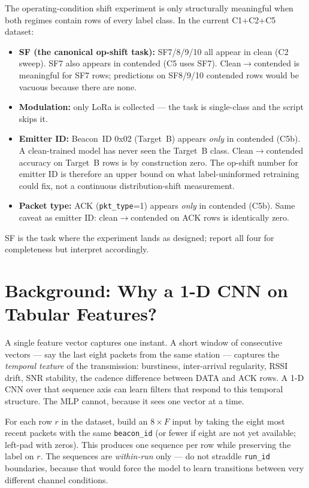 \documentclass[11pt,letterpaper]{article}
\begin{document}
\begin{tcolorbox}[warning={Op-shift validity is task-dependent}]
The operating-condition shift experiment is only structurally meaningful when both regimes contain rows of every label class. In the current C1+C2+C5 dataset:
\begin{itemize}[leftmargin=1.2em]
	\item \textbf{SF (the canonical op-shift task):} SF7/8/9/10 all appear in clean (C2 sweep). SF7 also appears in contended (C5 uses SF7). Clean$\to$contended is meaningful for SF7 rows; predictions on SF8/9/10 contended rows would be vacuous because there are none.
	\item \textbf{Modulation:} only LoRa is collected --- the task is single-class and the script skips it.
	\item \textbf{Emitter ID:} Beacon~ID 0x02 (Target~B) appears \emph{only} in contended (C5b). A clean-trained model has never seen the Target~B class. Clean$\to$contended accuracy on Target~B rows is by construction zero. The op-shift number for emitter ID is therefore an upper bound on what label-uninformed retraining could fix, not a continuous distribution-shift measurement.
	\item \textbf{Packet type:} ACK (\texttt{pkt\_type}=1) appears \emph{only} in contended (C5b). Same caveat as emitter ID: clean$\to$contended on ACK rows is identically zero.
\end{itemize}
SF is the task where the experiment lands as designed; report all four for completeness but interpret accordingly.
\end{tcolorbox}

\section{Background: Why a 1-D CNN on Tabular Features?}
A single feature vector captures one instant. A short window of consecutive vectors --- say the last eight packets from the same station --- captures the \emph{temporal texture} of the transmission: burstiness, inter-arrival regularity, \mbox{RSSI} drift, \mbox{SNR} stability, the cadence difference between DATA and ACK rows. A 1-D \mbox{CNN} over that sequence axis can learn filters that respond to this temporal structure. The \mbox{MLP} cannot, because it sees one vector at a time.

\begin{tcolorbox}[infobox={Sequence Construction}]
	For each row $r$ in the dataset, build an $8 \times F$ input by taking the eight most recent packets with the same \texttt{beacon\_id} (or fewer if eight are not yet available; left-pad with zeros). This produces one sequence per row while preserving the label on $r$. The sequences are \emph{within-run} only --- do not straddle \texttt{run\_id} boundaries, because that would force the model to learn transitions between very different channel conditions.
\end{tcolorbox}
\end{document}
